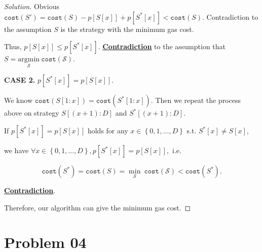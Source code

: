 \documentclass{article}
\newcommand{\set}[1]{\left\{#1\right\}}
\newenvironment{solution}{\begin{proof}[\noindent\it Solution]}{\end{proof}}
\begin{document}
\begin{solution}
    \hspace{2.6em}
    Obvious $\mathtt{cost}(S')=\mathtt{cost}(S)-p[S[x]]+p[S^*[x]]<\mathtt{cost}(S)$. Contradiction to the assumption $S$ is the strategy with the minimum gas cost.
    
    \hspace{2.6em}
    Thus, $p[S[x]]\le p[S^*[x]].$ \underline{\textbf{Contradiction}} to the assumption that $S = \underset{\mathcal{S}}{\mathrm{argmin}}\  \mathtt{cost}(\mathcal{S})$.
    
    \vspace{2em}\hspace{-2em}
    \textbf{CASE 2.} $p[S^*[x]]=p[S[x]].$
    
    \hspace{2.6em}
    We know $\mathtt{cost}(S[1:x])=\mathtt{cost}(S^*[1:x])$. Then we repeat the process above on strategy $S[(x+1):D]$ and $S^*[(x+1):D]$.
    
    \hspace{2.6em}
    If $p[S^*[x]]=p[S[x]]$ holds for any $x\in\set{0,1,...,D}$ s.t. $S^*[x]\neq S[x]$,
    
    \hspace{2.6em} 
    we have $\forall x\in\set{0,1,...,D}, p[S^*[x]]=p[S[x]],$ i.e.
    
    \vspace{-1.5em}
    $$\mathtt{cost}(S^*)=\mathtt{cost}(S)=\underset{\mathcal{S}}{\min}\ \mathtt{cost}(\mathcal{S}) < \mathtt{cost}(S^*).$$
    
    \vspace{-0.5em} \hspace{2.6em}
    \underline{\textbf{Contradiction}}.
    
    \vspace{3em} \hspace{-2em}
    Therefore, our algorithm can give the minimum gas cost.
\end{solution}

\vspace{3em}
\section{Problem 04}
\vspace{1em}
\end{document}
